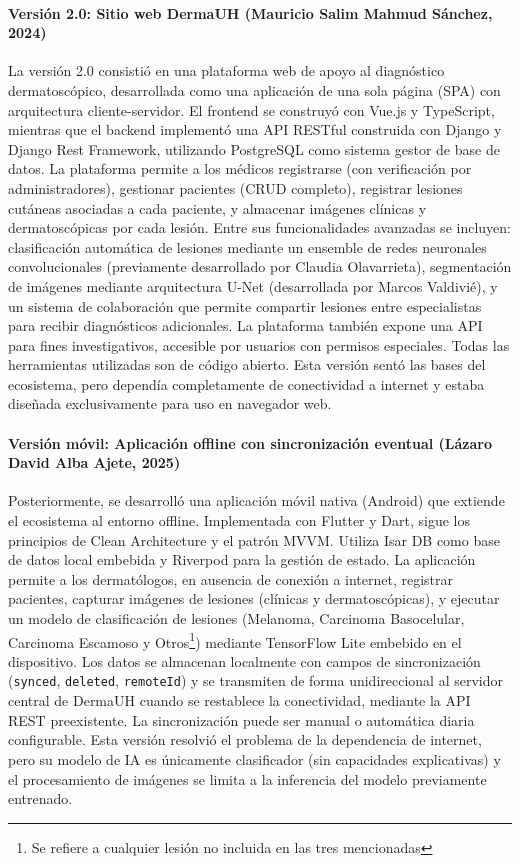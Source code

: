 \paragraph{Versión 2.0: Sitio web DermaUH (Mauricio Salim Mahmud Sánchez, 2024)}
La versión 2.0 consistió en una plataforma web de apoyo al diagnóstico dermatoscópico, 
desarrollada como una aplicación de una sola página (SPA) con arquitectura cliente-servidor. 
El frontend se construyó con Vue.js y TypeScript, mientras que el backend implementó una API RESTful
construida con Django y Django Rest Framework, utilizando PostgreSQL como sistema gestor de base 
de datos. La plataforma permite a los médicos registrarse (con verificación por administradores), 
gestionar pacientes (CRUD completo), registrar lesiones cutáneas asociadas a cada paciente, y 
almacenar imágenes clínicas y dermatoscópicas por cada lesión. Entre sus funcionalidades avanzadas 
se incluyen: clasificación automática de lesiones mediante un ensemble de redes neuronales 
convolucionales (previamente desarrollado por Claudia Olavarrieta), segmentación de imágenes 
mediante arquitectura U-Net (desarrollada por Marcos Valdivié), y un sistema de colaboración 
que permite compartir lesiones entre especialistas para recibir diagnósticos adicionales. 
La plataforma también expone una API para fines investigativos, accesible por usuarios con 
permisos especiales. Todas las herramientas utilizadas son de código abierto. Esta versión sentó 
las bases del ecosistema, pero dependía completamente de conectividad a internet y estaba 
diseñada exclusivamente para uso en navegador web.

\paragraph{Versión móvil: Aplicación offline con sincronización eventual (Lázaro David Alba Ajete, 2025)}
Posteriormente, se desarrolló una aplicación móvil nativa (Android) que extiende el ecosistema 
al entorno offline. Implementada con Flutter y Dart, sigue los principios de Clean Architecture y 
el patrón MVVM. Utiliza Isar DB como base de datos local embebida y Riverpod para la gestión de estado. 
La aplicación permite a los dermatólogos, en ausencia de conexión a internet, registrar pacientes, 
capturar imágenes de lesiones (clínicas y dermatoscópicas), y ejecutar un modelo de clasificación 
de lesiones (Melanoma, Carcinoma Basocelular, Carcinoma Escamoso y Otros\footnote{Se refiere a cualquier lesi\'on no incluida en las tres mencionadas}) mediante TensorFlow Lite embebido 
en el dispositivo. Los datos se almacenan localmente con campos de sincronización (\texttt{synced}, 
\texttt{deleted}, \texttt{remoteId}) y se transmiten de forma unidireccional al servidor central 
de DermaUH cuando se restablece la conectividad, mediante la API REST preexistente. 
La sincronización puede ser manual o automática diaria configurable. Esta versión resolvió el 
problema de la dependencia de internet, pero su modelo de IA es únicamente clasificador 
(sin capacidades explicativas) y el procesamiento de imágenes se limita a la inferencia del 
modelo previamente entrenado.

